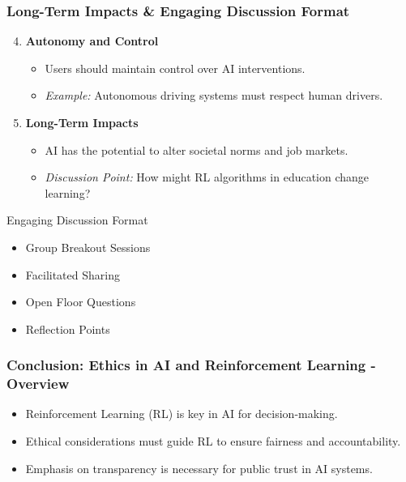 \documentclass[aspectratio=169]{beamer}
\begin{document}
\begin{frame}[fragile]
    \frametitle{Long-Term Impacts & Engaging Discussion Format}
    \begin{enumerate}
        \setcounter{enumi}{3}
        \item \textbf{Autonomy and Control}
            \begin{itemize}
                \item Users should maintain control over AI interventions.
                \item \textit{Example:} Autonomous driving systems must respect human drivers.
            \end{itemize}
        \item \textbf{Long-Term Impacts}
            \begin{itemize}
                \item AI has the potential to alter societal norms and job markets.
                \item \textit{Discussion Point:} How might RL algorithms in education change learning?
            \end{itemize}
    \end{enumerate}
    \begin{block}{Engaging Discussion Format}
        \begin{itemize}
            \item Group Breakout Sessions
            \item Facilitated Sharing
            \item Open Floor Questions
            \item Reflection Points
        \end{itemize}
    \end{block}
\end{frame}

\begin{frame}[fragile]
    \frametitle{Conclusion: Ethics in AI and Reinforcement Learning - Overview}
    \begin{itemize}
        \item Reinforcement Learning (RL) is key in AI for decision-making.
        \item Ethical considerations must guide RL to ensure fairness and accountability.
        \item Emphasis on transparency is necessary for public trust in AI systems.
    \end{itemize}
\end{frame}
\end{document}
